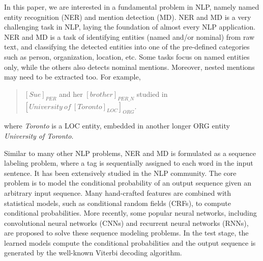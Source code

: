 \documentclass[11pt,a4paper]{article}
\begin{document}
In this paper, we are interested in a fundamental problem in NLP, namely named entity recognition (NER) and mention detection (MD). NER and MD is a very challenging task in NLP, laying the foundation of almost every NLP application.
NER and MD is a task of identifying entities (named and/or nominal) from raw text, and classifying the detected entities into one of the pre-defined categories such as person, organization, location, etc. Some tasks focus on named entities only, 
while the others also detects nominal mentions.%
Moreover, nested mentions may need to be extracted too. For example, 
\begin{quote}
	\small
	$[Sue]_{PER}$ and her $[brother]_{PER\_N}$ studied in ${[University\ of\ {[Toronto]}_{LOC}]}_{ORG}$. 
\end{quote}
where {\it Toronto} is a LOC entity, embedded in another longer ORG entity {\it University of Toronto}.

Similar to many other NLP problems, NER and MD is formulated as a sequence labeling problem, where a tag is sequentially assigned to each word in the input sentence. It has been extensively studied in the NLP community. The core problem is to model the conditional probability of an output sequence given an arbitrary input sequence. Many hand-crafted features are combined with statistical models, such as conditional random fields (CRFs), to compute conditional probabilities. More recently, some popular neural networks, including convolutional neural networks (CNNs) and recurrent neural networks (RNNs), are proposed to solve these sequence modeling problems.
In the test stage, the learned models compute the conditional probabilities and the output sequence is generated by the well-known Viterbi decoding algorithm. 
\end{document}
